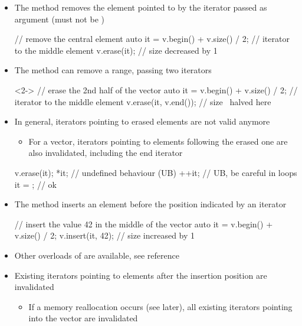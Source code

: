 \begin{frame}[fragile]{ \insertcontinuationtext}

  \begin{itemize}
  \item The  method removes the element pointed to by the iterator
    passed as argument (must not be )
    \begin{codeblock}
// remove the central element
auto it = v.begin() + v.size() / 2; // iterator to the middle element
v.erase(it);                        // size decreased by 1\end{codeblock}

  \item<2-> The  method can remove a range, passing two iterators
    \begin{codeblock}<2->{
// erase the 2nd half of the vector
auto it = v.begin() + v.size() / 2; // iterator to the middle element
v.erase(it, v.end());               // size ~halved here}\end{codeblock}

\item<3-> In general, iterators pointing to erased elements are not valid anymore
  \begin{itemize}
  \item For a vector, iterators pointing to elements following the erased one are
    also invalidated, including the end iterator
  \end{itemize}
  \begin{codeblock}
v.erase(it);
*it;       // undefined behaviour (UB)
++it;      // UB, be careful in loops
it = \ddd;  // ok\end{codeblock}
\end{itemize}

\end{frame}

\begin{frame}[fragile]{ \insertcontinuationtext}

  \begin{itemize}
  \item The  method inserts an element before the position
    indicated by an iterator
    \begin{codeblock}
// insert the value 42 in the middle of the vector
auto it = v.begin() + v.size() / 2;
v.insert(it, 42);                   // size increased by 1\end{codeblock}

  \item<2-> Other overloads of  are available, see reference
  \item<3-> Existing iterators pointing to elements after the insertion position
    are invalidated
    \begin{itemize}
    \item If a memory reallocation occurs (see later), all existing iterators
      pointing into the vector are invalidated
    \end{itemize}
  \end{itemize}

\end{frame}

